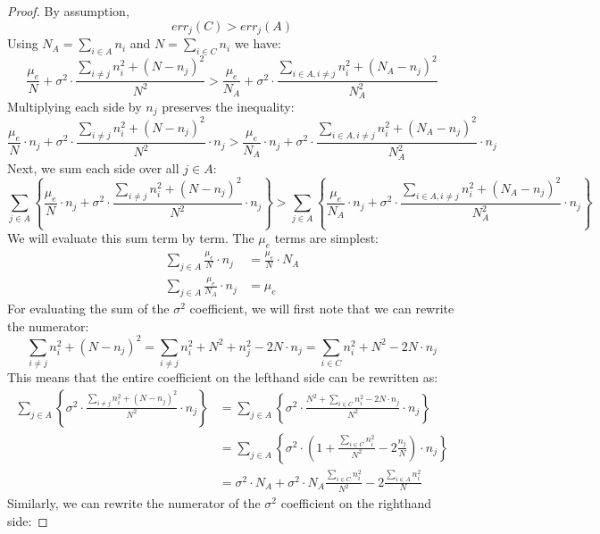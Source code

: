 \documentclass{article}
\newcommand{\p}[1]{\left( #1 \right)}
\newcommand{\cb}[1]{\left\{ #1 \right\}}
\newcommand{\cd}[0]{\cdot}
\newcommand{\mue}[0]{\ensuremath{\mu_e}}
\newcommand{\var}[0]{\ensuremath{\sigma^2}}
\newcommand{\ndraw}[0]{\ensuremath{n}}
\newcommand{\total}[0]{\ensuremath{N}}
\newcommand{\col}[0]{\ensuremath{C}}
\newcommand{\colA}[0]{\ensuremath{A}}
\begin{document}
\begin{proof}
By assumption, 
$$err_j(\col) > err_j(\colA)$$
Using $\total_\colA = \sum_{i \in \colA}\ndraw_i$ and $\total = \sum_{i \in \col}\ndraw_i$ we have:
$$\frac{\mue}{\total} + \var \cd \frac{\sum_{i\ne j}\ndraw_i^2 + (\total - \ndraw_j)^2}{\total^2} > \frac{\mue}{\total_\colA} + \var \cd \frac{\sum_{i\in \colA, i \ne j} \ndraw_i^2 + (\total_\colA - \ndraw_j)^2}{\total_\colA^2}$$
Multiplying each side by $\ndraw_j$ preserves the inequality: 
$$\frac{\mue}{\total}\cd \ndraw_j + \var\cd  \frac{\sum_{i\ne j}\ndraw_i^2 + (\total - \ndraw_j)^2}{\total^2}\cd \ndraw_j > \frac{\mue}{\total_\colA}\cd \ndraw_j + \var \cd \frac{\sum_{i\in \colA, i \ne j} \ndraw_i^2 + (\total_\colA - \ndraw_j)^2}{\total_\colA^2} \cd \ndraw_j$$
Next, we sum each side over all $j \in \colA$:
$$\sum_{j \in \colA}\cb{\frac{\mue}{\total}\cd \ndraw_j + \var\cd  \frac{\sum_{i\ne j}\ndraw_i^2 + (\total - \ndraw_j)^2}{\total^2}\cd \ndraw_j }> \sum_{j \in \colA} \cb{\frac{\mue}{\total_\colA}\cd \ndraw_j + \var \cd \frac{\sum_{i\in \colA, i \ne j} \ndraw_i^2 + (\total_\colA - \ndraw_j)^2}{\total_\colA^2} \cd \ndraw_j}$$
We will evaluate this sum term by term. The $\mue$ terms are simplest: 
\begin{align*}
\sum_{j \in \colA}\frac{\mue}{\total}\cd \ndraw_j &= \frac{\mue}{\total} \cd \total_\colA\\
\sum_{j \in \colA} \frac{\mue}{\total_\colA}\cd \ndraw_j  &= \mue
\end{align*}
For evaluating the sum of the $\var$ coefficient, we will first note that we can rewrite the numerator: 
$$\sum_{i\ne j}\ndraw_i^2 + (\total - \ndraw_j)^2 = \sum_{i\ne j}\ndraw_i^2 + \total^2 + \ndraw_j^2 - 2 \total \cd \ndraw_j = \sum_{i \in \col} \ndraw_i^2+ \total^2 - 2 \total \cd \ndraw_j$$
This means that the entire coefficient on the lefthand side can be rewritten as: 
\begin{align*}
 \sum_{j \in \colA}\cb{\var\cd  \frac{\sum_{i\ne j}\ndraw_i^2 + (\total - \ndraw_j)^2}{\total^2} \cd \ndraw_j} &= \sum_{j \in \colA}\cb{\var \cd \frac{\total^2 + \sum_{i \in \col}\ndraw_i^2 - 2 \total \cd \ndraw_j}{\total^2} \cd \ndraw_j}   \\
&=\sum_{j \in \colA}\cb{\var \cd \p{1 + \frac{\sum_{i \in \col} \ndraw_i^2}{\total^2} - 2 \frac{\ndraw_j}{\total}} \cd \ndraw_j } \\
&= \var \cd \total_\colA + \var \cd \total_\colA \frac{\sum_{i \in \col} \ndraw_i^2}{\total^2} - 2 \frac{\sum_{i \in \colA}\ndraw_i^2}{\total} 
\end{align*}
Similarly, we can rewrite the numerator of the $\var$ coefficient on the righthand side: 

\end{proof}
\end{document}

